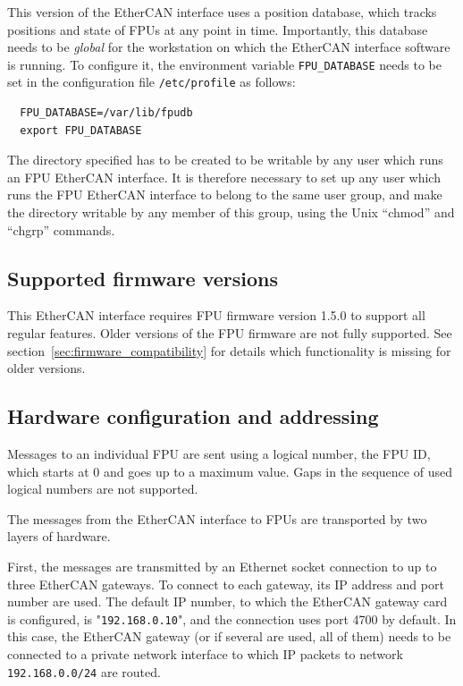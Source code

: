 \documentclass[11pt,a4paper]{scrartcl}
\begin{document}
This version of the EtherCAN interface uses a position database, which tracks
positions and state of FPUs at any point in time. Importantly, this
database needs to be \emph{global} for the workstation on which the
EtherCAN interface software is running. To configure it, the environment variable
\texttt{FPU\_DATABASE} needs to be set in the configuration file
\texttt{/etc/profile} as follows:

%
\begin{verbatim}
  FPU_DATABASE=/var/lib/fpudb
  export FPU_DATABASE
\end{verbatim}

The directory specified has to be created to be writable by any user
which runs an FPU EtherCAN interface. It is therefore necessary to set up any user
which runs the FPU EtherCAN interface to belong to the same user group, and make
the directory writable by any member of this group, using the Unix
``chmod'' and ``chgrp'' commands.

\subsection{Supported firmware versions}
This EtherCAN interface requires FPU firmware version 1.5.0 to support all regular
features. Older versions of the FPU firmware are not fully supported.
See section~\ref{sec:firmware_compatibility} for details which
functionality is missing for older versions.

\subsection{Hardware configuration and addressing}
Messages to an individual FPU are sent using a logical number, the FPU
ID, which starts at 0 and goes up to a maximum value. Gaps in the
sequence of used logical numbers are not supported.

The messages from the EtherCAN interface to FPUs are transported by two layers of
hardware.

   First, the
messages are transmitted by an Ethernet socket connection to up to
three EtherCAN gateways. To connect to each gateway, its IP address
and port number are used. The default IP number, to which the EtherCAN
gateway card is configured, is "\texttt{192.168.0.10}", and the
connection uses port 4700 by default. In this case, the EtherCAN
gateway (or if several are used, all of them) needs to be connected to
a private network interface to which IP packets to network
\texttt{192.168.0.0/24} are routed.
\end{document}
